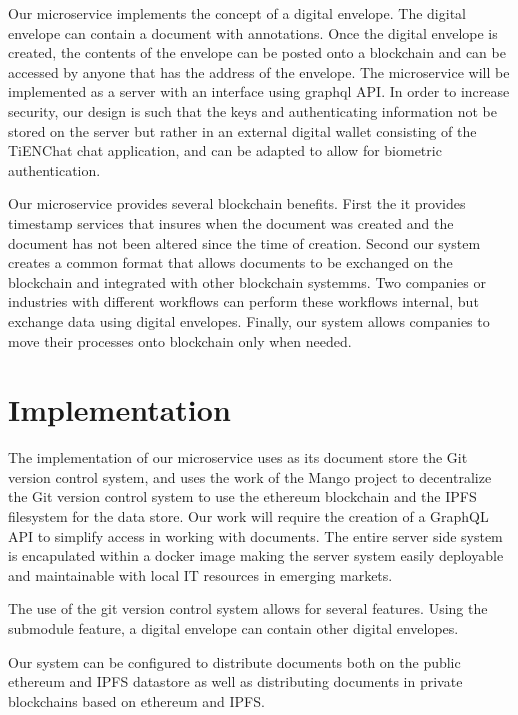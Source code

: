 \documentclass[journal]{IEEEtran}
\begin{document}
Our microservice implements the concept of a digital envelope.  The
digital envelope can contain a document with annotations.  Once the
digital envelope is created, the contents of the envelope can be
posted onto a blockchain and can be accessed by anyone that has the
address of the envelope.  The microservice will be implemented as a
server with an interface using graphql API.  In order to increase
security, our design is such that the keys and authenticating
information not be stored on the server but rather in an external
digital wallet consisting of the TiENChat chat application, and can be
adapted to allow for biometric authentication.

Our microservice provides several blockchain benefits.  First the it
provides timestamp services that insures when the document was created
and the document has not been altered since the time of
creation. Second our system creates a common format that allows
documents to be exchanged on the blockchain and integrated with other
blockchain systemms.  Two companies or industries with different
workflows can perform these workflows internal, but exchange data
using digital envelopes.  Finally, our system allows companies to move
their processes onto blockchain only when needed.

\section{Implementation}

The implementation of our microservice uses as its document store the
Git version control system, and uses the work of the Mango
project\cite{mango} to decentralize the Git version control system \cite{git} to use the
ethereum blockchain and the IPFS filesystem\cite{ipfs} for the data
store.  Our work will require the creation of a GraphQL API to
simplify access in working with documents.  The entire server side
system is encapulated within a docker image making the server system
easily deployable and maintainable with local IT resources in emerging
markets.

The use of the git version control system allows for several
features.  Using the submodule feature, a digital envelope can contain
other digital envelopes.

Our system can be configured to distribute documents both on the
public ethereum and IPFS datastore as well as distributing documents
in private blockchains based on ethereum and IPFS.
\end{document}
